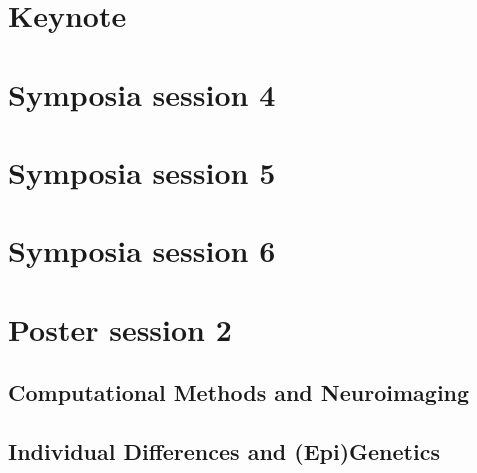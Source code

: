 
\section{Keynote}


\newpage

\section{Symposia session 4}

\newpage

\section{Symposia session 5}


\newpage

\section{Symposia session 6}

\newpage

\section{Poster session 2}

\subsection*{Computational Methods and Neuroimaging}

% 
% 
% 
% 
% 
% 
% 
% 
% 
% 
% 

\subsection*{Individual Differences and (Epi)Genetics}

% 
% 
% 
% 
% 
% 
% 
% 
% 
% 

